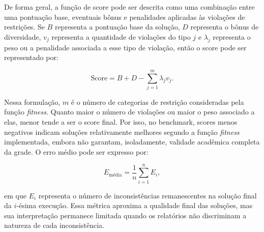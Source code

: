 De forma geral, a função de score pode ser descrita como uma combinação entre uma pontuação base, eventuais bônus e penalidades aplicadas às violações de restrições. Se \(B\) representa a pontuação base da solução, \(D\) representa o bônus de diversidade, \(v_j\) representa a quantidade de violações do tipo \(j\) e \(\lambda_j\) representa o peso ou a penalidade associada a esse tipo de violação, então o score pode ser representado por:

\begin{equation}
\text{Score} = B + D - \sum_{j=1}^{m}\lambda_j v_j.
\end{equation}

Nessa formulação, \(m\) é o número de categorias de restrição consideradas pela função \textit{fitness}. Quanto maior o número de violações ou maior o peso associado a elas, menor tende a ser o score final. Por isso, no benchmark, scores menos negativos indicam soluções relativamente melhores segundo a função \textit{fitness} implementada, embora não garantam, isoladamente, validade acadêmica completa da grade. O erro médio pode ser expresso por:

\begin{equation}
E_{\text{média}} = \frac{1}{n}\sum_{i=1}^{n} E_i,
\end{equation}

em que \(E_i\) representa o número de inconsistências remanescentes na solução final da \(i\)-ésima execução. Essa métrica aproxima a qualidade final das soluções, mas sua interpretação permanece limitada quando os relatórios não discriminam a natureza de cada inconsistência.
